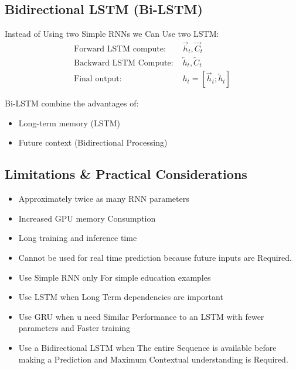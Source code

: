 \subsection{Bidirectional LSTM (Bi-LSTM)}

Instead of Using two Simple RNNs we Can Use two LSTM:
\begin{align}
\text{Forward LSTM compute: } & \overrightarrow{h}_t, \overrightarrow{C}_t \\
\text{Backward LSTM Compute: } & \overleftarrow{h}_t, \overleftarrow{C}_t \\
\text{Final output: } & h_t = [\overrightarrow{h}_t; \overleftarrow{h}_t]
\end{align}

Bi-LSTM combine the advantages of:
\begin{itemize}
    \item Long-term memory (LSTM)
    \item Future context (Bidirectional Processing)
\end{itemize}

\subsection{Limitations \& Practical Considerations}

\begin{advbox}[Limitation]
\begin{itemize}
    \item Approximately twice as many RNN parameters
    \item Increased GPU memory Consumption
    \item Long training and inference time
    \item Cannot be used for real time prediction because future inputs are Required.
\end{itemize}
\end{advbox}

\begin{propertybox}
\begin{itemize}
    \item Use Simple RNN only For simple education examples
    \item Use LSTM when Long Term dependencies are important
    \item Use GRU when u need Similar Performance to an LSTM with fewer parameters and Faster training
    \item Use a Bidirectional LSTM when The entire Sequence is available before making a Prediction and Maximum Contextual understanding is Required.
\end{itemize}
\end{propertybox}


